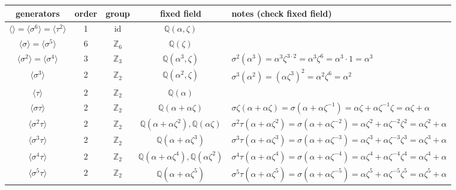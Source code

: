 \documentclass{article}
\theoremstyle{definition}
\begin{document}
\vspace{0.4cm}

\hspace*{-3.5cm}
\begin{tabular}{ c c c c | p{7.5cm} }
  \hline
  generators & order & group & fixed field & notes (check fixed field)\\
\hline
  $\langle \rangle = \langle \sigma^6 \rangle=\langle \tau^2 \rangle$ & 1 & id & $\mathbb{Q}(\alpha,\zeta)$ & \\
  $\langle \sigma \rangle = \langle \sigma^5 \rangle$ & 6 & $\mathbb{Z}_6$ & $\mathbb{Q}(\zeta)$ & \\
  $\langle \sigma^2 \rangle=\langle \sigma^4 \rangle$ & 3 & $\mathbb{Z}_3$ & $\mathbb{Q}(\alpha^3, \zeta)$ & $\sigma^2(\alpha^3)=\alpha^3 \zeta^{3\cdot 2}=\alpha^3 \zeta^6 = \alpha^3 \cdot 1 = \alpha^3$\\
  $\langle \sigma^3 \rangle$ & 2 & $\mathbb{Z}_2$ & $\mathbb{Q}(\alpha^2,\zeta)$ & $\sigma^3(\alpha^2)=(\alpha\zeta^3)^2=\alpha^2\zeta^6=\alpha^2$\\
  \hline
  $\langle \tau \rangle$ & 2 & $\mathbb{Z}_2$ & $\mathbb{Q}(\alpha)$ & \\
  \hline
  $\langle \sigma\tau \rangle$ & 2 & $\mathbb{Z}_2$ & $\mathbb{Q}(\alpha+\alpha\zeta)$ &
      $\sigma\zeta(\alpha+\alpha\zeta)=\sigma(\alpha+\alpha\zeta^{-1}) = \alpha\zeta + \alpha\zeta^{-1}\zeta=\alpha\zeta+\alpha$\\
  $\langle \sigma^2\tau \rangle$ & 2 & $\mathbb{Z}_2$ & $\mathbb{Q}(\alpha+\alpha\zeta^2), \mathbb{Q}(\alpha\zeta)$ &
      $\sigma^2\tau(\alpha+\alpha\zeta^2) = \sigma(\alpha+\alpha\zeta^{-2})=\alpha\zeta^2+ \alpha\zeta^{-2}\zeta^2=\alpha\zeta^2+\alpha$\\
  $\langle \sigma^3\tau \rangle$ & 2 & $\mathbb{Z}_2$ & $\mathbb{Q}(\alpha+\alpha\zeta^3)$ &
      $\sigma^3\tau(\alpha+\alpha\zeta^3) = \sigma(\alpha+\alpha\zeta^{-3})=\alpha\zeta^3+ \alpha\zeta^{-3}\zeta^3=\alpha\zeta^3+\alpha$\\
  $\langle \sigma^4\tau \rangle$ & 2 & $\mathbb{Z}_2$ & $\mathbb{Q}(\alpha+\alpha\zeta^4), \mathbb{Q}(\alpha\zeta^2)$ &
      $\sigma^4\tau(\alpha+\alpha\zeta^4) = \sigma(\alpha+\alpha\zeta^{-4})=\alpha\zeta^4+ \alpha\zeta^{-4}\zeta^4=\alpha\zeta^4+\alpha$\\
  $\langle \sigma^5\tau \rangle$ & 2 & $\mathbb{Z}_2$ & $\mathbb{Q}(\alpha+\alpha\zeta^5)$ &
      $\sigma^5\tau(\alpha+\alpha\zeta^5) = \sigma(\alpha+\alpha\zeta^{-5})=\alpha\zeta^5+ \alpha\zeta^{-5}\zeta^5=\alpha\zeta^5+\alpha$\\

\end{tabular}
\end{document}
